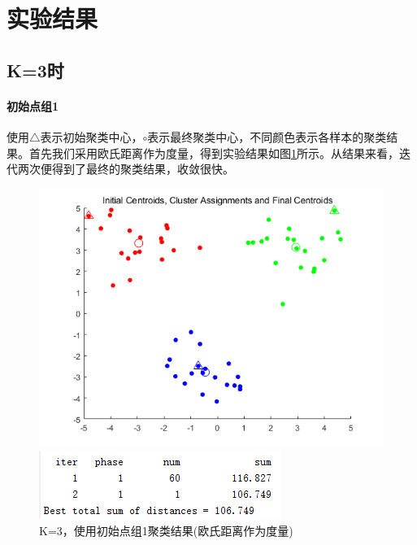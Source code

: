 \documentclass[cn]{elegantbook}
\begin{document}
\section{实验结果}
\subsection{K=3时}
\paragraph{初始点组1}
使用$\triangle$表示初始聚类中心，$\circ$表示最终聚类中心，不同颜色表示各样本的聚类结果。首先我们采用欧氏距离作为度量，得到实验结果如图\ref{res31}所示。从结果来看，迭代两次便得到了最终的聚类结果，收敛很快。
\begin{figure}[!h]
	\centering
	\begin{minipage}{0.48\linewidth}
		\centering
		\includegraphics[width=\linewidth]{images/res31}
	\end{minipage}
	\begin{minipage}{0.48\linewidth}
		\centering
		\includegraphics[width=\linewidth]{images/res311}
	\end{minipage}
	\caption{\label{res31}K=3，使用初始点组1聚类结果(欧氏距离作为度量)}
\end{figure}
\end{document}
